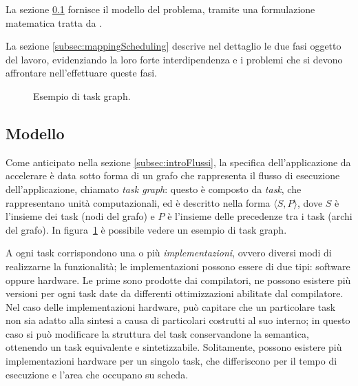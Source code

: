 La sezione \ref{subsec:modello} fornisce il modello del problema, tramite una formulazione matematica tratta
da \cite{ModelloRedaelli,ReconfigurableSystemDesignVerification}.

La sezione \ref{subsec:mappingScheduling} descrive nel dettaglio le due fasi oggetto del lavoro, evidenziando
la loro forte interdipendenza e i problemi che si devono affrontare nell'effettuare queste fasi.

\begin{figure}[ht]
\begin{center}
\caption{Esempio di task graph.}
\label{fig:taskGraphExample}
\end{center}
\end{figure}

\subsection{Modello}
\label{subsec:modello}
Come anticipato nella sezione \ref{subsec:introFlussi}, la specifica dell'applicazione
da accelerare è data sotto forma di un grafo che
rappresenta il flusso di esecuzione dell'applicazione, chiamato \emph{task
graph}: questo è composto da \emph{task},
che rappresentano unità computazionali, ed \`e descritto nella forma
$\langle S, P \rangle$, dove $S$ è l'insieme dei task (nodi del grafo) e $P$
\`e l'insieme delle precedenze tra i task (archi del grafo).
In figura~\ref{fig:taskGraphExample} è possibile vedere un esempio di
task graph.

A ogni task corrispondono una o più \emph{implementazioni}, ovvero diversi modi di
realizzarne la funzionalità; le implementazioni possono essere di due tipi: software
oppure hardware. Le prime sono prodotte dai compilatori, ne possono
esistere più versioni per ogni task date da differenti ottimizzazioni abilitate dal
compilatore.
Nel caso delle implementazioni hardware, pu\`o capitare che un particolare task non sia adatto
alla sintesi a causa di particolari costrutti al suo interno; in questo caso si pu\`o modificare
la struttura del task conservandone la semantica, ottenendo un task equivalente e sintetizzabile.
Solitamente, possono esistere più implementazioni hardware per un singolo task,
che differiscono per il tempo di esecuzione e l'area che occupano su scheda.

